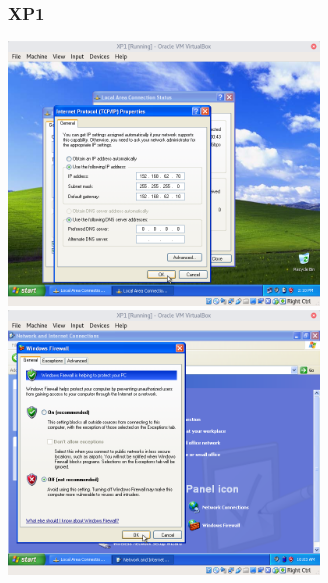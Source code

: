 \subsubsection*{XP1}
\includegraphics[height=7cm]{img/WinXPNetworkConfiguration.png}
\includegraphics[height=7cm]{img/WinXPFirewallDisabled.png}\par
